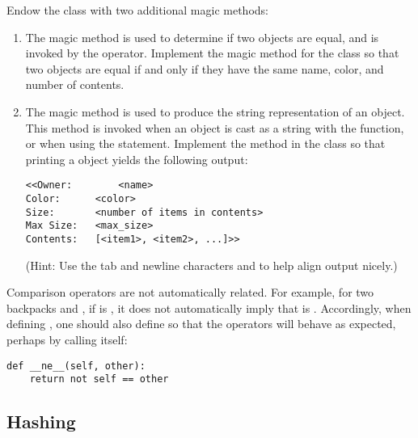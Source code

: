 \begin{problem} %
Endow the  class with two additional magic methods:
\begin{enumerate}
\item The  magic method is used to determine if two objects are equal, and is invoked by the \li{==} operator.
Implement the  magic method for the  class so that two  objects are equal if and only if they have the same name, color, and number of contents.

\item The  magic method is used to produce the string representation of an object.
This method is invoked when an object is cast as a string with the  function, or when using the  statement.
Implement the  method in the  class so that printing a  object yields the following output:
\begin{lstlisting}
<<Owner:		<name>
Color:		<color>
Size:       <number of items in contents>
Max Size:   <max_size>
Contents:   [<item1>, <item2>, ...]>>
\end{lstlisting}
(Hint: Use the tab and newline characters  and  to help align output nicely.)
\end{enumerate}
\end{problem}

\begin{warn}
Comparison operators are not automatically related.
For example, for two backpacks  and , if  is , it does not automatically imply that  is .
Accordingly, when defining , one should also define  so that the operators will behave as expected, perhaps by calling  itself:
\begin{lstlisting}
def __ne__(self, other):
    return not self == other
\end{lstlisting}
\end{warn}

\subsection*{Hashing} %

